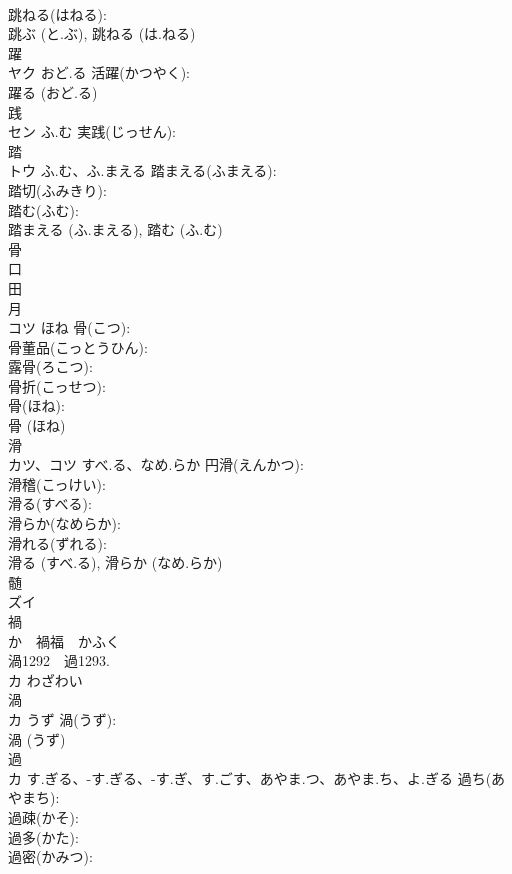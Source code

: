 \documentclass[8pt]{extreport}
\begin{document}
\begin{CJK}{UTF8}{min}
\\	跳ねる(はねる): 
\\	跳ぶ (と.ぶ), 跳ねる (は.ねる)
\\	躍			
\\	ヤク	おど.る	活躍(かつやく): 
\\	躍る (おど.る)
\\	践			
\\	セン	ふ.む	実践(じっせん): 
\\	踏			
\\	トウ	ふ.む、ふ.まえる	踏まえる(ふまえる): 
\\	踏切(ふみきり): 
\\	踏む(ふむ): 
\\	踏まえる (ふ.まえる), 踏む (ふ.む)
\\	骨			
\\	口 
\\	田 
\\	月 
\\	コツ	ほね	骨(こつ): 
\\	骨董品(こっとうひん): 
\\	露骨(ろこつ): 
\\	骨折(こっせつ): 
\\	骨(ほね): 
\\	骨 (ほね)
\\	滑			
\\	カツ、コツ	すべ.る、なめ.らか	円滑(えんかつ): 
\\	滑稽(こっけい): 
\\	滑る(すべる): 
\\	滑らか(なめらか): 
\\	滑れる(ずれる): 
\\	滑る (すべ.る), 滑らか (なめ.らか)
\\	髄			
\\	ズイ			
\\	禍			
\\	か　禍福　かふく 
\\	渦1292　過1293.	
\\	カ	わざわい		
\\	渦			
\\	カ	うず	渦(うず): 
\\	渦 (うず)
\\	過			
\\	カ	す.ぎる、-す.ぎる、-す.ぎ、す.ごす、あやま.つ、あやま.ち、よ.ぎる	過ち(あやまち): 
\\	過疎(かそ): 
\\	過多(かた): 
\\	過密(かみつ): 

\end{CJK}
\end{document}
